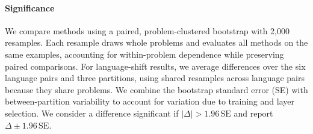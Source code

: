 \paragraph{Significance}

We compare methods using a paired, problem-clustered bootstrap with 2,000 resamples. Each resample draws whole problems and evaluates all methods on the same examples, accounting for within-problem dependence while preserving paired comparisons. For language-shift results, we average differences over the six language pairs and three partitions, using shared resamples across language pairs because they share problems. We combine the bootstrap standard error (SE) with between-partition variability to account for variation due to training and layer selection. We consider a difference significant if $|\Delta| > 1.96\,\mathrm{SE}$ and report $\Delta \pm 1.96\,\mathrm{SE}$.




